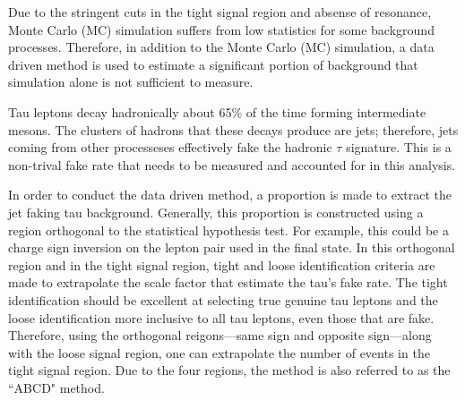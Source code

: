 
Due to the stringent cuts in the tight signal region and absense of resonance, Monte Carlo (MC) simulation suffers from low statistics for some background processes.  
Therefore, in addition to the Monte Carlo (MC) simulation, a data driven method is used to estimate a significant portion of background that simulation alone is not sufficient to measure. 

Tau leptons decay hadronically about 65\% of the time forming intermediate mesons. 
The clusters of hadrons that these decays produce are jets; therefore, jets coming from other processeses effectively fake the hadronic $\tau$ signature. This is a non-trival fake rate that needs to be measured and accounted for in this analysis. 

In order to conduct the data driven method, a proportion is made to extract the jet faking tau background. Generally, this proportion is constructed using a region orthogonal to the statistical hypothesis test. For example, this could be a charge sign inversion on the lepton pair used in the final state. In this orthogonal region and in the tight signal region, tight and loose identification criteria are made to extrapolate the scale factor that estimate the tau's fake rate. 
The tight identification should be excellent at selecting true genuine tau leptons and the loose identification more inclusive to all tau leptons, even those that are fake. 
Therefore, using the orthogonal reigons---same sign and opposite sign---along with the loose signal region, one can extrapolate the number of events in the tight signal region. Due to the four regions, the method is also referred to as the ``ABCD" method. 


